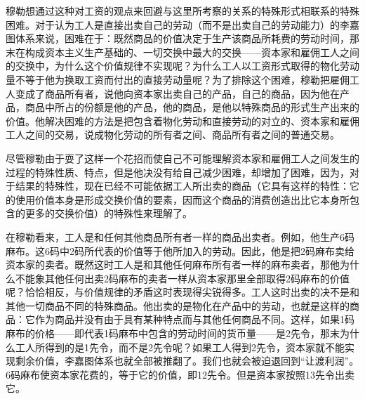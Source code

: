穆勒想通过这种对工资的观点来回避与这里所考察的关系的特殊形式相联系的特殊困难。对于认为工人是直接出卖自己的劳动（而不是出卖自己的劳动能力）的李嘉图体系来说，困难在于：既然商品的价值决定于生产该商品所耗费的劳动时间，那末在构成资本主义生产基础的、一切交换中最大的交换——资本家和雇佣工人之间的交换中，为什么这个价值规律不实现呢？为什么工人以工资形式取得的物化劳动量不等于他为换取工资而付出的直接劳动量呢？为了排除这个困难，穆勒把雇佣工人变成了商品所有者，说他向资本家出卖自己的产品，自己的商品，因为他在产品，商品中所占的份额是他的产品，他的商品，是他以特殊商品的形式生产出来的价值。他解决困难的方法是把包含着物化劳动和直接劳动的对立的、资本家和雇佣工人之间的交易，说成物化劳动的所有者之间、商品所有者之间的普通交易。

尽管穆勒由于耍了这样一个花招而使自己不可能理解资本家和雇佣工人之间发生的过程的特殊性质、特点，但是他决没有给自己减少困难，却增加了困难，因为，对于结果的特殊性，现在已经不可能依据工人所出卖的商品（它具有这样的特性：它的使用价值本身是形成交换价值的要素，因而这个商品的消费创造出比它本身所包含的更多的交换价值）的特殊性来理解了。

在穆勒看来，工人是和任何其他商品所有者一样的商品出卖者。例如，他生产6码麻布。这6码中2码所代表的价值等于他所加入的劳动。因此，他是把2码麻布卖给资本家的卖者。既然这时工人是和其他任何麻布所有者一样的麻布卖者，那他为什么不能象其他任何出卖2码麻布的卖者一样从资本家那里全部取得2码麻布的价值呢？恰恰相反，与价值规律的矛盾这时表现得尖锐得多。工人这时出卖的决不是和其他一切商品不同的特殊商品。他出卖的是物化在产品中的劳动，也就是这样的商品：它作为商品并没有由于具有某种特点而与其他任何商品不同。这样，如果1码麻布的价格——即代表1码麻布中包含的劳动时间的货币量——是2先令，那末为什么工人所得到的是1先令，而不是2先令呢？如果工人得到2先令，资本家就不能实现剩余价值，李嘉图体系也就全部被推翻了。我们也就会被迫退回到“让渡利润”。6码麻布使资本家花费的，等于它的价值，即12先令。但是资本家按照13先令出卖它。

